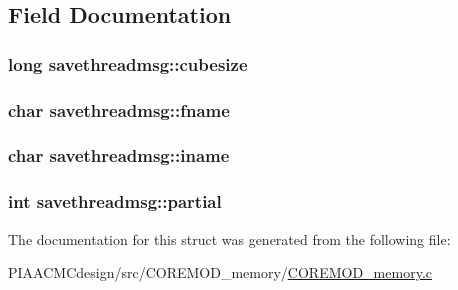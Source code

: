 \subsection{Field Documentation}
\hypertarget{structsavethreadmsg_aabe32dc91c33ab3536ad6d2b6730159f}{
\subsubsection[{cubesize}]{\setlength{\rightskip}{0pt plus 5cm}long savethreadmsg\+::cubesize}}\label{structsavethreadmsg_aabe32dc91c33ab3536ad6d2b6730159f}
\hypertarget{structsavethreadmsg_af7952ae8c942d61aea68919f599642ad}{
\subsubsection[{fname}]{\setlength{\rightskip}{0pt plus 5cm}char savethreadmsg\+::fname}}\label{structsavethreadmsg_af7952ae8c942d61aea68919f599642ad}
\hypertarget{structsavethreadmsg_a193e6da8b15ce983972c4c79391781a7}{
\subsubsection[{iname}]{\setlength{\rightskip}{0pt plus 5cm}char savethreadmsg\+::iname}}\label{structsavethreadmsg_a193e6da8b15ce983972c4c79391781a7}
\hypertarget{structsavethreadmsg_a67b95feb0e172459de37d4e23fab693b}{
\subsubsection[{partial}]{\setlength{\rightskip}{0pt plus 5cm}int savethreadmsg\+::partial}}\label{structsavethreadmsg_a67b95feb0e172459de37d4e23fab693b}


The documentation for this struct was generated from the following file\+:\begin{DoxyCompactItemize}
\item 
P\+I\+A\+A\+C\+M\+Cdesign/src/\+C\+O\+R\+E\+M\+O\+D\+\_\+memory/\hyperlink{PIAACMCdesign_2src_2COREMOD__memory_2COREMOD__memory_8c}{C\+O\+R\+E\+M\+O\+D\+\_\+memory.\+c}\end{DoxyCompactItemize}
